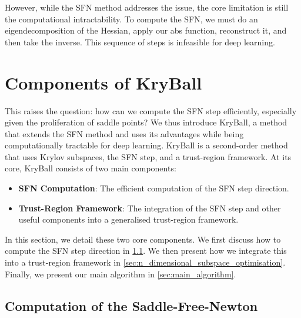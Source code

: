 However, while the SFN method addresses the issue, the core limitation is still the computational intractability. To compute the SFN, we must do an eigendecomposition of the Hessian, apply our abs function, reconstruct it, and then take the inverse. This sequence of steps is infeasible for deep learning.  

\section{Components of KryBall}
\label{sec:kryball_optimisation_algorithm}
This raises the question: how can we compute the SFN step efficiently, especially given the proliferation of saddle points? We thus introduce KryBall, a method that extends the SFN method and uses its advantages while being computationally tractable for deep learning. KryBall is a second-order method that uses Krylov subspaces, the SFN step, and a trust-region framework. At its core, KryBall consists of two main components: 
\begin{itemize}
    \item \textbf{SFN Computation}: The efficient computation of the SFN step direction.
    \item \textbf{Trust-Region Framework}: The integration of the SFN step and other useful components into a generalised trust-region framework.
\end{itemize}
In this section, we detail these two core components. We first discuss how to compute the SFN step direction in \cref{sec:computation_of_the_saddle_free_newton}. We then present how we integrate this into a trust-region framework in \cref{sec:n_dimensional_subspace_optimisation}. Finally, we present our main algorithm in \cref{sec:main_algorithm}.

\subsection{Computation of the Saddle-Free-Newton}
\label{sec:computation_of_the_saddle_free_newton}


